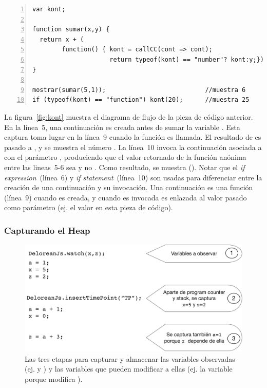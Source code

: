 \documentclass[conference]{IEEEtran}
\begin{document}


\begin{lstlisting}[linewidth=\columnwidth,numbers=left]
var kont;

function sumar(x,y) {
  return x + (
        function() { kont = callCC(cont => cont);
                     return typeof(kont) == "number"? kont:y;})();
}

mostrar(sumar(5,1));                           //muestra 6
if (typeof(kont) == "function") kont(20);      //muestra 25
\end{lstlisting}

La figura~\ref{fig:kont} muestra el diagrama de flujo de la pieza de c\'odigo anterior. En la l\'inea~5, una continuaci\'on  es creada antes de sumar la variable . Esta captura toma lugar en la l\'inea~9 cuando la funci\'on  es llamada. El resultado de  es pasado a , y se muestra el n\'umero . La l\'inea~10 invoca la continuaci\'on asociada a  con el par\'ametro , produciendo que el valor retornado de la funci\'on an\'onima entre las lineas~5-6 sea  y no . Como resultado, se muestra  (). Notar que el {\em if expression}~(l\'inea~6) y {\em if statement}~(l\'inea~10) son usadas para diferenciar entre la creaci\'on de una continuaci\'on y su invocaci\'on. Una continuaci\'on es una funci\'on (l\'inea~9) cuando es creada, y cuando es invocada es enlazada al valor pasado como par\'ametro (ej. el valor  en esta pieza de c\'odigo).         

\smallskip

\subsubsection{Capturando el Heap}
\label{sec:heap}

\begin{figure}[t]
\begin{center}
\includegraphics[width=.8\linewidth]{fig-heap1}
\caption{Las tres etapas para capturar y almacenar las variables observadas (ej.  y ) y las variables que pueden modificar a ellas (ej. la variable  porque modifica ).}
\label{fig:heap1}
\end{center}
\end{figure}
\end{document}
